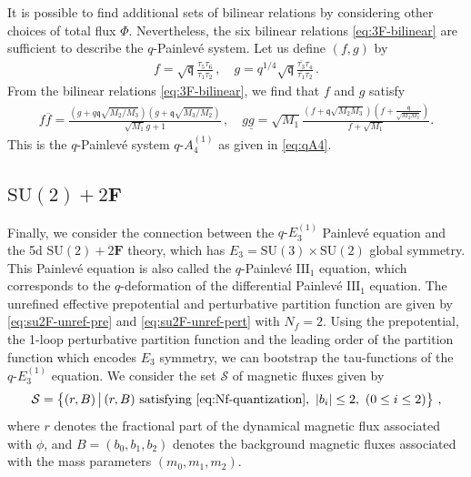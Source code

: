 \documentclass[11pt, a4paper]{article}
\theoremstyle{definition}
\begin{document}
It is possible to find additional sets of bilinear relations by considering other choices of total flux $ \Phi $. Nevertheless, the six bilinear relations \eqref{eq:3F-bilinear} are sufficient to describe the $ q $-Painlev\'e system. Let us define $ (f,g) $ by
\begin{align}
    f = \sqrt{\mathfrak{q}} \frac{\tau_5 \tau_6}{\tau_1\tau_2} \, , \quad
    g = q^{1/4} \sqrt{\mathfrak{q}} \frac{\overline{\tau_3} \tau_4}{\overline{\tau_1}\tau_2} \, .
\end{align}
From the bilinear relations \eqref{eq:3F-bilinear}, we find that $ f $ and $ g $ satisfy
\begin{align}
    f\overline{f} = \frac{(g+q\mathfrak{q}\sqrt{M_2/M_3}) (g+\mathfrak{q}\sqrt{M_3/M_2})}{\sqrt{M_1} g+1} \, , \quad
    g\underline{g} = \sqrt{M_1} \frac{(f+\mathfrak{q}\sqrt{M_2M_3}) (f+\frac{\mathfrak{q}}{\sqrt{M_2M_3}})}{f+\sqrt{M_1}} .
\end{align}
This is the $ q $-Painlev\'e system $ q\text{-}A_4^{(1)} $ as given in \eqref{eq:qA4}.


\subsection{\texorpdfstring{$ \mathrm{SU}(2) + 2\mathbf{F} $}{SU(2) + 2F}}\label{sec:2F}

Finally, we consider the connection between the $ q\text{-}E_3^{(1)} $ Painlev\'e equation and the 5d $ \mathrm{SU}(2)+2\mathbf{F} $ theory, which has $ E_3 = \mathrm{SU}(3) \times \mathrm{SU}(2) $ global symmetry. This Painlev\'e equation is also called the $ q $-Painlev\'e $ \text{III}_1 $ equation, which corresponds to the $ q $-deformation of the differential Painlev\'e $ \text{III}_1 $ equation. The unrefined effective prepotential and perturbative partition function are given by \eqref{eq:su2F-unref-pre} and \eqref{eq:su2F-unref-pert} with $ N_f=2 $. Using the prepotential, the 1-loop perturbative partition function and the leading order of the partition function which encodes $ E_3 $ symmetry, we can bootstrap the tau-functions of the $ q\text{-}E_3^{(1)} $ equation. We consider the set $ \mathcal{S} $ of magnetic fluxes given by
\begin{align}
    \mathcal{S} = \left\{ (r,B) \, \big| \, (r,B) \text{ satisfying \eqref{eq:Nf-quantization}}, \ |b_i| \leq 2 , \ (0 \leq i \leq 2) \right\} \, ,
\end{align}
where $ r $ denotes the fractional part of the dynamical magnetic flux associated with $ \phi $, and $ B=(b_0,b_1,b_2) $ denotes the background magnetic fluxes associated with the mass parameters $ (m_0,m_1,m_2) $.
\end{document}

